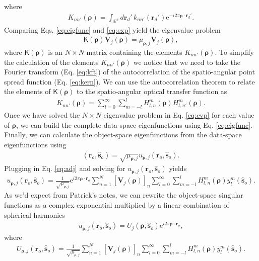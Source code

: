 \documentclass[11pt]{article}
\newcommand{\me}{\mathrm{e}}
\providecommand{\mb}[1]{\mathbf{#1}}
\providecommand{\ro}[1]{\mathbf{\mathbf{r}}_o}
\providecommand{\so}[1]{\mathbf{\hat{s}}_o}
\providecommand{\rd}[1]{\mathbf{r}_d}
\providecommand{\mbb}[1]{\mathbb{#1}}
\providecommand{\bs}[1]{\boldsymbol{#1}}
\begin{document}
where
\begin{align}
  K_{nn'}(\bs{\rho}) = \int_{\mbb{R}^2}d\rd{}'\, k_{nn'}(\rd{}')\me{}^{-i 2\pi \bs{\rho}\cdot\rd{}'}. \label{eq:kft}
\end{align}
Comparing Eqs. \ref{eq:eigfunc} and \ref{eq:exp} yield the eigenvalue problem
\begin{align}
  \mathsf{K}(\bs{\rho})\mb{V}_j(\bs{\rho}) = \mu_{\bs{\rho}, j}\mb{V}_j(\bs{\rho}), \label{eq:evp}
\end{align}
where $\mathsf{K}(\bs{\rho})$ is an $N\times N$ matrix containing the elements
$K_{nn'}(\bs{\rho})$. To simplify the calculation of the elements
$K_{nn'}(\bs{\rho})$ we notice that we need to take the Fourier transform (Eq.
\ref{eq:kft}) of the autocorrelation of the spatio-angular point spread function
(Eq. \ref{eq:kern}). We can use the autocorrelation theorem to relate the
elements of $\mathsf{K}(\bs{\rho})$ to the spatio-angular optical transfer
function as
\begin{align}
  K_{nn'}(\bs{\rho}) = \sum_{l=0}^{\infty}\sum_{m=-l}^l H_{l,n}^m(\bs{\rho}) H_{l,n'}^m(\bs{\rho}). \label{eq:ksimp}
\end{align}
Once we have solved the $N\times N$ eigenvalue problem in Eq. \ref{eq:evp} for
each value of $\bs{\rho}$, we can build the complete data-space eigenfunctions using
Eq. \ref{eq:eigfunc}. Finally, we can calculate the object-space eigenfunctions from
the data-space eigenfunctions using
\begin{align}
  [\mathcal{H}^{\dagger}\mb{v}_{\bs{\rho},j}](\ro{}, \so{}) = \sqrt{\mu_{\bs{\rho}, j}}u_{\bs{\rho},j}(\ro{}, \so{}).
\end{align}
Plugging in Eq. \ref{eq:adj} and solving for $u_{\bs{\rho},j}(\ro{}, \so{})$ yields
\begin{align}
  u_{\bs{\rho},j}(\ro{}, \so{}) = \frac{1}{\sqrt{\mu_{\bs{\rho},j}}}\me{}^{i2\pi\bs{\rho}\cdot\ro{}}\sum_{n=1}^N[\mb{V}_j(\bs{\rho})]_n \sum_{l=0}^{\infty}\sum_{m=-l}^l H_{l,n}^m(\bs{\rho})y_l^m(\so{}).
\end{align}
As we'd expect from Patrick's notes, we can rewrite the object-space singular
functions as a complex exponential multiplied by a linear combination of
spherical harmonics
\begin{align}
u_{\bs{\rho},j}(\ro{}, \so{}) = U_j(\bs{\rho}, \so{}) \me{}^{i2\pi\bs{\rho}\cdot\ro{}},
\end{align}
where
\begin{align}
  U_{\bs{\rho},j}(\ro{}, \so{}) = \frac{1}{\sqrt{\mu_{\bs{\rho},j}}}\sum_{n=1}^N[\mb{V}_j(\bs{\rho})]_n \sum_{l=0}^{\infty}\sum_{m=-l}^l H_{l,n}^m(\bs{\rho})y_l^m(\so{}).
\end{align}
\end{document}
